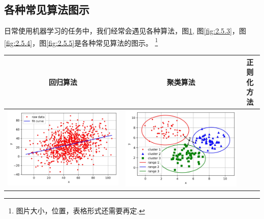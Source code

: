 \subsection{各种常见算法图示}
\label{ux5404ux79cdux5e38ux89c1ux7b97ux6cd5ux56feux793a}
日常使用机器学习的任务中，我们经常会遇见各种算法，图\ref{fig:2.5.2},
图\ref{fig:2.5.3}，图\ref{fig:2.5.4}，图\ref{fig:2.5.5}是各种常见算法的图示。
\footnote{图片大小，位置，表格形式还需要再定.}
\begin{longtable}[]{ccc}
  \label{fig:2.5.2}
\toprule
回归算法 & 聚类算法 & 正则化方法
\tabularnewline
\midrule
\endhead
\begin{minipage}{0.1\linewidth}
  \includegraphics[width=1.0\linewidth]{./img/ch2/sec1/1.jpg}
\end{minipage}
&
\begin{minipage}{0.1\linewidth}
\includegraphics[width=1.0\linewidth]{./img/ch2/sec1/2.jpg}  

\end{minipage}
\end{longtable}
